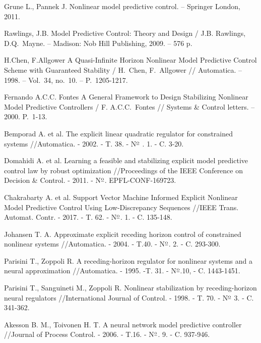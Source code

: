 \begin{biblio}

Grune L., Pannek J. Nonlinear model predictive control. -- Springer London, 2011.

Rawlings, J.B. Model Predictive Control: Theory and Design / J.B. Rawlings, D.Q.~Mayne. -- Madison:
Nob Hill Publishing, 2009. -- 576 p.

H.Chen, F.Allgower A Quasi-Infinite Horizon Nonlinear Model Predictive Control Scheme with Guaranteed Stability /  H.~Chen,  F.~Allgower  // 
Automatica. -- 1998. -- Vol.~34, no.~10. -- P.~1205-1217.

Fernando A.C.C. Fontes A General Framework to Design Stabilizing Nonlinear Model Predictive Controllers / F. A.C.C.~Fontes // Systems \& Control letters.  -- 2000.  P.~1-13.

Bemporad A. et al. The explicit linear quadratic regulator for constrained systems //Automatica. - 2002. - T. 38. - N$\textsuperscript{\underline{o}}$ . 1. - C. 3-20.

Domahidi A. et al. Learning a feasible and stabilizing explicit model predictive control law by robust optimization //Proceedings of the IEEE Conference on Decision \& Control. - 2011. - N$\textsuperscript{\underline{o}}$. EPFL-CONF-169723.

Chakrabarty A. et al. Support Vector Machine Informed Explicit Nonlinear Model Predictive Control Using Low-Discrepancy Sequences //IEEE Trans. Automat. Contr. - 2017. - T. 62. - N$\textsuperscript{\underline{o}}$. 1. - C. 135-148.

Johansen T. A. Approximate explicit receding horizon control of constrained nonlinear systems //Automatica.  - 2004. - T.40. - N$\textsuperscript{\underline{o}}$. 2. - C. 293-300.

Parisini T., Zoppoli R. A receding-horizon regulator for nonlinear systems and a neural approximation //Automatica. - 1995. -T. 31. - N$\textsuperscript{\underline{o}}$.10, - C. 1443-1451.

Parisini T., Sanguineti M., Zoppoli R. Nonlinear stabilization by receding-horizon neural regulators //International Journal of Control. - 1998. - T. 70. - N$\textsuperscript{\underline{o}}$ 3. - C. 341-362.

Akesson B. M., Toivonen H. T. A neural network model predictive controller //Journal of Process Control. - 2006. - T.16. - N$\textsuperscript{\underline{o}}$. 9. - C. 937-946.


\end{biblio}
